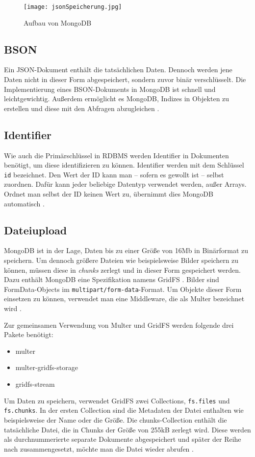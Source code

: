 \begin{figure}
    \centering
    \texttt{[image: jsonSpeicherung.jpg]}
    \caption{Aufbau von MongoDB \cite[S.30]{zwei}}
    \label{img:jsonSpeicherung}
\end{figure}

\subsection{BSON}
Ein JSON-Dokument enthält die tatsächlichen Daten. Dennoch werden jene Daten nicht in dieser Form abgespeichert, sondern zuvor binär verschlüsselt. Die Implementierung eines BSON-Dokuments in MongoDB ist schnell und leichtgewichtig. Außerdem ermöglicht es MongoDB, Indizes in Objekten zu erstellen und diese mit den Abfragen abzugleichen \cite[S.31]{zwei}. 


\subsection{Identifier}

Wie auch die Primärschlüssel in RDBMS werden Identifier in Dokumenten benötigt, um diese identifizieren zu können. Identifier werden mit dem Schlüssel \texttt{id} bezeichnet. Den Wert der ID kann man – sofern es gewollt ist – selbst zuordnen. Dafür kann jeder beliebige Datentyp verwendet werden, außer Arrays. Ordnet man selbst der ID keinen Wert zu, übernimmt dies MongoDB automatisch \cite[S.32]{zwei}.


\subsection{Dateiupload}
MongoDB ist in der Lage, Daten bis zu einer Größe von 16Mb in Binärformat zu speichern. Um dennoch größere Dateien wie beispielsweise Bilder speichern zu können, müssen diese in \textit{chunks} zerlegt und in dieser Form gespeichert werden. Dazu enthält MongoDB eine Spezifikation namens GridFS \cite{gridfs}.  Bilder sind FormData-Objects im \texttt{multipart/form-data}-Format. Um Objekte dieser Form einsetzen zu können, verwendet man eine Middleware, die als Multer bezeichnet wird \cite{multer}. 

Zur gemeinsamen Verwendung von Multer und GridFS werden folgende drei Pakete benötigt:
\begin{itemize}
    \item multer
    \item multer-gridfs-storage
    \item gridfs-stream
\end{itemize}

Um Daten zu speichern, verwendet GridFS zwei Collections, \texttt{fs.files} und \texttt{fs.chunks}. In der ersten Collection sind die Metadaten der Datei enthalten wie beispielsweise der Name oder die Größe. Die chunks-Collection enthält die tatsächliche Datei, die in Chunks der Größe von 255kB zerlegt wird. Diese werden als durchnummerierte separate Dokumente abgespeichert und später der Reihe nach zusammengesetzt, möchte man die Datei wieder abrufen \cite{ganguli}. 
